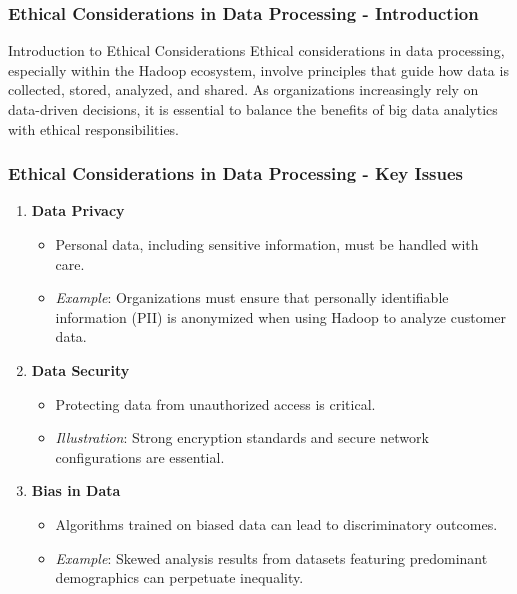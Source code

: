 \documentclass[aspectratio=169]{beamer}
\begin{document}
\begin{frame}[fragile]
    \frametitle{Ethical Considerations in Data Processing - Introduction}
    \begin{block}{Introduction to Ethical Considerations}
        Ethical considerations in data processing, especially within the Hadoop ecosystem, involve principles that guide how data is collected, stored, analyzed, and shared. 
        As organizations increasingly rely on data-driven decisions, it is essential to balance the benefits of big data analytics with ethical responsibilities.
    \end{block}
\end{frame}

\begin{frame}[fragile]
    \frametitle{Ethical Considerations in Data Processing - Key Issues}
    \begin{enumerate}
        \item \textbf{Data Privacy} 
            \begin{itemize}
                \item Personal data, including sensitive information, must be handled with care.
                \item \textit{Example}: Organizations must ensure that personally identifiable information (PII) is anonymized when using Hadoop to analyze customer data.
            \end{itemize}
        
        \item \textbf{Data Security} 
            \begin{itemize}
                \item Protecting data from unauthorized access is critical.
                \item \textit{Illustration}: Strong encryption standards and secure network configurations are essential.
            \end{itemize}
        
        \item \textbf{Bias in Data} 
            \begin{itemize}
                \item Algorithms trained on biased data can lead to discriminatory outcomes.
                \item \textit{Example}: Skewed analysis results from datasets featuring predominant demographics can perpetuate inequality.
            \end{itemize}


\end{enumerate}
\end{frame}
\end{document}
